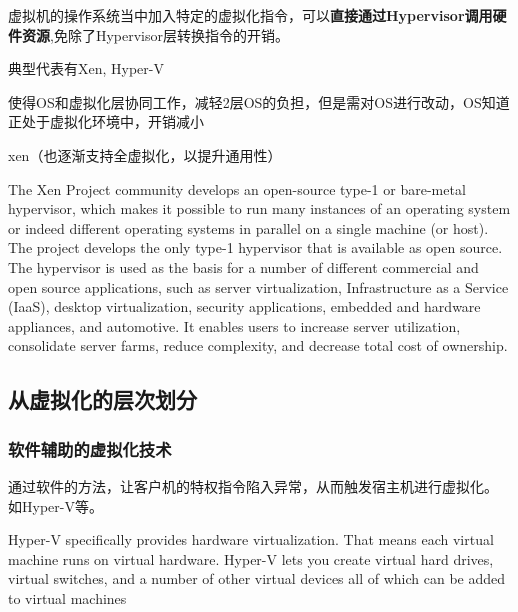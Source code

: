 \begin{definition}[半虚拟化]
    虚拟机的操作系统当中加入特定的虚拟化指令，可以\textbf{直接通过Hypervisor调用硬件资源},免除了Hypervisor层转换指令的开销。 
    
    典型代表有Xen, Hyper-V
\end{definition}

使得OS和虚拟化层协同工作，减轻2层OS的负担，但是需对OS进行改动，OS知道正处于虚拟化环境中，开销减小

xen（也逐渐支持全虚拟化，以提升通用性）

\begin{definition}[Xen]
    The Xen Project community develops an open-source type-1 or bare-metal hypervisor, which makes it possible to run many instances of an operating system or indeed different operating systems in parallel on a single machine (or host). The project develops the only type-1 hypervisor that is available as open source. The hypervisor is used as the basis for a number of different commercial and open source applications, such as server virtualization, Infrastructure as a Service (IaaS), desktop virtualization, security applications, embedded and hardware appliances, and automotive. It enables users to increase server utilization, consolidate server farms, reduce complexity, and decrease total cost of ownership.
\end{definition}

\subsection{从虚拟化的层次划分}

\subsubsection{软件辅助的虚拟化技术}

\begin{definition}[软件辅助的虚拟化技术]
    通过软件的方法，让客户机的特权指令陷入异常，从而触发宿主机进行虚拟化。 如Hyper-V等。 
\end{definition}

\begin{definition}[Hyper-V]
    Hyper-V specifically provides hardware virtualization. That means each virtual machine runs on virtual hardware. Hyper-V lets you create virtual hard drives, virtual switches, and a number of other virtual devices all of which can be added to virtual machines
\end{definition}

